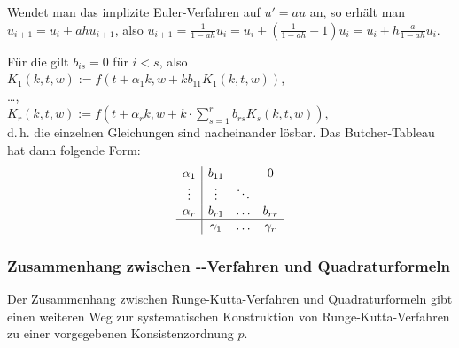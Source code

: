 \begin{Bsp}
    Wendet man das implizite Euler-Verfahren auf $u' = au$ an,
    so erhält man\\
    $u_{i+1} = u_i + ahu_{i+1}$, also
    $u_{i+1} = \frac{1}{1 - ah} u_i =
    u_i + \left(\frac{1}{1 - ah} - 1\right) u_i =
    u_i + h \frac{a}{1 - ah} u_i$.
\end{Bsp}

\begin{Bsp}
    Für die 
    gilt $b_{is} = 0$ für $i < s$, also\\
    $K_1(k, t, w) := f(t + \alpha_1 k,
    w + k b_{11} K_1(k, t, w))$,\\
    \dots,\\
    $K_r(k, t, w) := f(t + \alpha_r k,
    w + k \cdot \sum_{s=1}^r b_{rs} K_s(k, t, w))$,\\
    d.\,h. die einzelnen Gleichungen sind nacheinander lösbar.
    Das Butcher-Tableau hat dann folgende Form:
    \begin{align*}
        \begin{array}{c|cccc}
            \alpha_1 & b_{11} & & 0\\
            \vdots & \vdots & \ddots\\
            \alpha_r & b_{r1} & \hdots & b_{rr}\\\hline
            & \gamma_1 & \hdots & \gamma_r
        \end{array}
    \end{align*}
\end{Bsp}

\pagebreak

\subsubsection{%
    Zusammenhang zwischen --Verfahren und
    Quadraturformeln%
}

\begin{Bem}
    Der Zusammenhang zwischen Runge-Kutta-Verfahren und Quadraturformeln
    gibt einen weiteren Weg zur systematischen Konstruktion von
    Runge-Kutta-Verfahren zu einer vorgegebenen Konsistenzordnung $p$.
\end{Bem}

